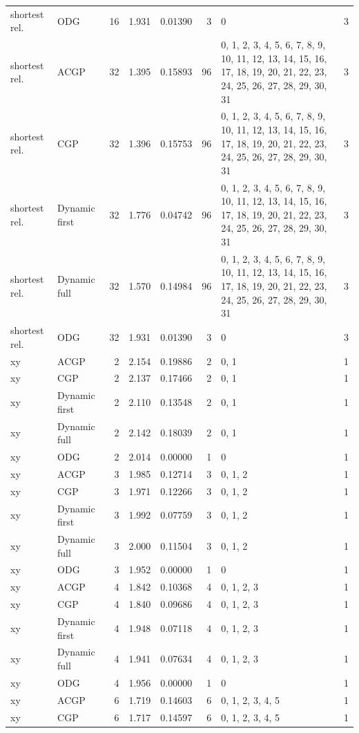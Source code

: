 \documentclass[10pt,a4paper]{article}
\begin{document}
\begin{longtable}{@{}p{23mm}p{29mm}rrrrp{36mm}r@{}}
shortest rel. & ODG & 16 & 1.931 & 0.01390 & 3 & 0 & 3 \\
shortest rel. & ACGP & 32 & 1.395 & 0.15893 & 96 & 0, 1, 2, 3, 4, 5, 6, 7, 8, 9, 10, 11, 12, 13, 14, 15, 16, 17, 18, 19, 20, 21, 22, 23, 24, 25, 26, 27, 28, 29, 30, 31 & 3 \\
shortest rel. & CGP & 32 & 1.396 & 0.15753 & 96 & 0, 1, 2, 3, 4, 5, 6, 7, 8, 9, 10, 11, 12, 13, 14, 15, 16, 17, 18, 19, 20, 21, 22, 23, 24, 25, 26, 27, 28, 29, 30, 31 & 3 \\
shortest rel. & Dynamic first & 32 & 1.776 & 0.04742 & 96 & 0, 1, 2, 3, 4, 5, 6, 7, 8, 9, 10, 11, 12, 13, 14, 15, 16, 17, 18, 19, 20, 21, 22, 23, 24, 25, 26, 27, 28, 29, 30, 31 & 3 \\
shortest rel. & Dynamic full & 32 & 1.570 & 0.14984 & 96 & 0, 1, 2, 3, 4, 5, 6, 7, 8, 9, 10, 11, 12, 13, 14, 15, 16, 17, 18, 19, 20, 21, 22, 23, 24, 25, 26, 27, 28, 29, 30, 31 & 3 \\
shortest rel. & ODG & 32 & 1.931 & 0.01390 & 3 & 0 & 3 \\
xy & ACGP & 2 & 2.154 & 0.19886 & 2 & 0, 1 & 1 \\
xy & CGP & 2 & 2.137 & 0.17466 & 2 & 0, 1 & 1 \\
xy & Dynamic first & 2 & 2.110 & 0.13548 & 2 & 0, 1 & 1 \\
xy & Dynamic full & 2 & 2.142 & 0.18039 & 2 & 0, 1 & 1 \\
xy & ODG & 2 & 2.014 & 0.00000 & 1 & 0 & 1 \\
xy & ACGP & 3 & 1.985 & 0.12714 & 3 & 0, 1, 2 & 1 \\
xy & CGP & 3 & 1.971 & 0.12266 & 3 & 0, 1, 2 & 1 \\
xy & Dynamic first & 3 & 1.992 & 0.07759 & 3 & 0, 1, 2 & 1 \\
xy & Dynamic full & 3 & 2.000 & 0.11504 & 3 & 0, 1, 2 & 1 \\
xy & ODG & 3 & 1.952 & 0.00000 & 1 & 0 & 1 \\
xy & ACGP & 4 & 1.842 & 0.10368 & 4 & 0, 1, 2, 3 & 1 \\
xy & CGP & 4 & 1.840 & 0.09686 & 4 & 0, 1, 2, 3 & 1 \\
xy & Dynamic first & 4 & 1.948 & 0.07118 & 4 & 0, 1, 2, 3 & 1 \\
xy & Dynamic full & 4 & 1.941 & 0.07634 & 4 & 0, 1, 2, 3 & 1 \\
xy & ODG & 4 & 1.956 & 0.00000 & 1 & 0 & 1 \\
xy & ACGP & 6 & 1.719 & 0.14603 & 6 & 0, 1, 2, 3, 4, 5 & 1 \\
xy & CGP & 6 & 1.717 & 0.14597 & 6 & 0, 1, 2, 3, 4, 5 & 1 \\

\end{longtable}
\end{document}
